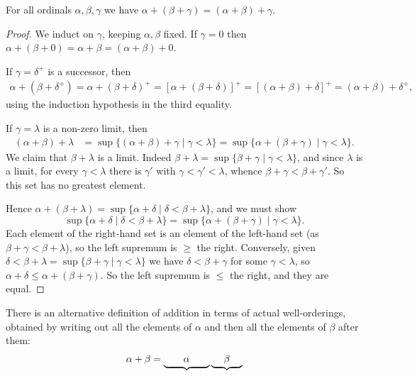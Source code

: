 \documentclass[a4paper]{scrartcl}
\begin{document}
\begin{proposition}
  For all ordinals $\alpha, \beta, \gamma$ we have $\alpha + (\beta + \gamma) = (\alpha + \beta) + \gamma$.
\end{proposition}
\begin{proof}
We induct on $\gamma$, keeping $\alpha, \beta$ fixed. If $\gamma = 0$ then $\alpha+(\beta+0) = \alpha+\beta = (\alpha+\beta)+0$.

If $\gamma = \delta^+$ is a successor, then
\begin{align*}
  \alpha + (\beta + \delta^+) = \alpha + (\beta + \delta)^+
  = [\alpha + (\beta + \delta)]^+ = [(\alpha + \beta) + \delta]^+
  = (\alpha + \beta) + \delta^+,
\end{align*}
using the induction hypothesis in the third equality.

If $\gamma = \lambda$ is a non-zero limit, then
\begin{align*}
(\alpha+\beta)+\lambda & =\sup \{(\alpha+\beta)+\gamma \mid \gamma<\lambda\} =\sup \{\alpha+(\beta+\gamma) \mid \gamma<\lambda\}.
\end{align*}
We claim that $\beta+\lambda$ is a limit. Indeed $\beta+\lambda=\sup \{\beta+\gamma \mid \gamma<\lambda\}$, and since $\lambda$ is a limit, for every $\gamma < \lambda$ there is $\gamma'$ with $\gamma < \gamma' < \lambda$, whence $\beta + \gamma < \beta + \gamma'$. So this set has no greatest element.

Hence $\alpha + (\beta + \lambda) = \sup\{\alpha + \delta \mid \delta < \beta + \lambda\}$, and we must show
$$\sup\{\alpha + \delta \mid \delta < \beta +\lambda\} = \sup \{\alpha + (\beta + \gamma) \mid \gamma < \lambda\}.$$
Each element of the right-hand set is an element of the left-hand set (as $\beta + \gamma < \beta + \lambda$), so the left supremum is $\geq$ the right. Conversely, given $\delta < \beta + \lambda = \sup\{\beta + \gamma \mid \gamma < \lambda\}$ we have $\delta < \beta + \gamma$ for some $\gamma < \lambda$, so $\alpha + \delta \leq \alpha + (\beta+\gamma)$. So the left supremum is $\leq$ the right, and they are equal.
\end{proof}

There is an alternative definition of addition in terms of actual well-orderings, obtained by writing out all the elements of $\alpha$ and then all the elements of $\beta$ after them:
\[
  \alpha + \beta = \underbrace{\quad\quad\vphantom{\beta}\alpha\vphantom{\beta}\quad\quad}\underbrace{\quad\;\beta\;\quad}
\]
\end{document}

